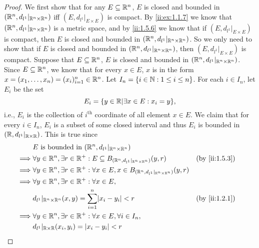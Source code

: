 \begin{proof}
  We first show that for any \(E \subseteq \mathbb{R}^n\), \(E\) is closed and bounded in \((\mathbb{R}^n, d_{l^1}|_{\mathbb{R}^n \times \mathbb{R}^n})\) iff \((E, d_{l^1}|_{E \times E})\) is compact.
  By \cref{ii:ex:1.1.7} we know that \((\mathbb{R}^n, d_{l^1}|_{\mathbb{R}^n \times \mathbb{R}^n})\) is a metric space, and by \cref{ii:1.5.6} we know that if \((E, d_{l^1}|_{E \times E})\) is compact, then \(E\) is closed and bounded in \((\mathbb{R}^n, d_{l^1}|_{\mathbb{R}^n \times \mathbb{R}^n})\).
  So we only need to show that if \(E\) is closed and bounded in \((\mathbb{R}^n, d_{l^1}|_{\mathbb{R}^n \times \mathbb{R}^n})\), then \((E, d_{l^1}|_{E \times E})\) is compact.
  Suppose that \(E \subseteq \mathbb{R}^n\), \(E\) is closed and bounded in \((\mathbb{R}^n, d_{l^1}|_{\mathbb{R}^n \times \mathbb{R}^n})\).
  Since \(E \subseteq \mathbb{R}^n\), we know that for every \(x \in E\), \(x\) is in the form \(x = (x_1, \dots, x_n) = (x_i)_{i = 1}^n \in \mathbb{R}^n\).
  Let \(I_n = \left\lbrace i \in \mathbb{N} : 1 \leq i \leq n\right\rbrace\).
  For each \(i \in I_n\), let \(E_i\) be the set
  \[
    E_i = \set{y \in \R | \exists x \in E : x_i = y},
  \]
  i.e., \(E_i\) is the collection of \(i^{\text{th}}\) coordinate of all element \(x \in E\).
  We claim that for every \(i \in I_n\), \(E_i\) is a subset of some closed interval and thus \(E_i\) is bounded in \((\mathbb{R}, d_{l^1}|_{\mathbb{R} \times \mathbb{R}})\).
  This is true since
  \begin{align*}
             & E \text{ is bounded in } (\R^n, d_{l^1}|_{\R^n \times \R^n})                                                                  \\
    \implies & \forall y \in \R^n, \exists r \in \R^+ : E \subseteq B_{(\R^n, d_{l^1}|_{\R^n \times \R^n})}(y, r)            &  & \by{ii:1.5.3} \\
    \implies & \forall y \in \R^n, \exists r \in \R^+ : \forall x \in E, x \in B_{(\R^n, d_{l^1}|_{\R^n \times \R^n})}(y, r)                 \\
    \implies & \forall y \in \R^n, \exists r \in \R^+ : \forall x \in E,                                                                     \\
             & d_{l^1}|_{\R^n \times \R^n}(x, y) = \sum_{i = 1}^n \abs{x_i - y_i} < r                                        &  & \by{ii:1.2.1} \\
    \implies & \forall y \in \R^n, \exists r \in \R^+ : \forall x \in E, \forall i \in I_n,                                                  \\
             & d_{l^1}|_{\R \times \R}(x_i, y_i) = \abs{x_i - y_i} < r                                                                       \\

\end{align*}
\end{proof}
